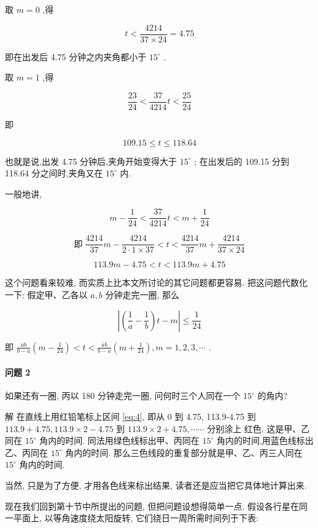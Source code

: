 \documentclass{ctexart}
\begin{document}
取 \(m = 0\) ,得

\[
t < \frac{4214}{{37} \times {24}} = {4.75}
\]

即在出发后 4.75 分钟之内夹角都小于 \({15}^{ \circ }\) .

取 \(m = 1\) ,得

\[
\frac{23}{24} < \frac{37}{4214}t < \frac{25}{24}
\]

即

\[
{109.15} \leq t \leq {118.64}
\]

也就是说,出发 4.75 分钟后,夹角开始变得大于 \({15}^{ \circ }\) ; 在出发后的 109.15 分到 118.64 分之间时,夹角又在 \({15}^{ \circ }\) 内.

一般地讲,

\[
m - \frac{1}{24} < \frac{37}{4214}t < m + \frac{1}{24}
\]

\[
\text{即}\;\frac{4214}{37}m - \frac{4214}{2 \cdot 1 \times {37}} < t < \frac{4214}{37}m + \frac{4214}{{37} \times {24}}
\]

\begin{equation}
\label{eq:4}
{113.9m} - {4.75} < t < {113.9m} + {4.75}
\end{equation}

这个问题看来较难, 而实质上比本文所讨论的其它问题都更容易. 把这问题代数化一下: 假定甲、乙各以 \(a,b\) 分钟走完一圈, 那么

\[
\left| {\left( {\frac{1}{a} - \frac{1}{b}}\right) t - m}\right| \leq \frac{1}{24}
\]

即 \(\frac{ab}{b - a}\left( {m - \frac{1}{24}}\right) < t < \frac{ab}{b - a}\left( {m + \frac{1}{24}}\right) ,m = 1,2,3,\cdots\) .

\paragraph*{问题 2} 如果还有一圈, 丙以 180 分钟走完一圈, 问何时三个人同在一个 \({15}^{ \circ }\) 的角内?

解 在直线上用红铅笔标上区间 \ref{eq:4}, 即从 0 到 4.75, 113.9-4.75 到 \({113.9} + {4.75},{113.9} \times 2 - {4.75}\) 到 \({113.9} \times 2 + {4.75},\cdots \cdots\) 分别涂上 红色. 这是甲、乙同在 \({15}^{ \circ }\) 角内的时间. 同法用绿色线标出甲、丙同在 \({15}^{ \circ }\) 角内的时间,用蓝色线标出乙、丙同在 \({15}^{ \circ }\) 角内的时间. 那么三色线段的重复部分就是甲、乙、丙三人同在 \({15}^{ \circ }\) 角内的时间.

当然, 只是为了方便, 才用各色线来标出结果, 读者还是应当把它具体地计算出来.

现在我们回到第十节中所提出的问题, 但把问题设想得简单一点. 假设各行星在同一平面上, 以等角速度绕太阳旋转, 它们绕日一周所需时间列于下表:
\end{document}
